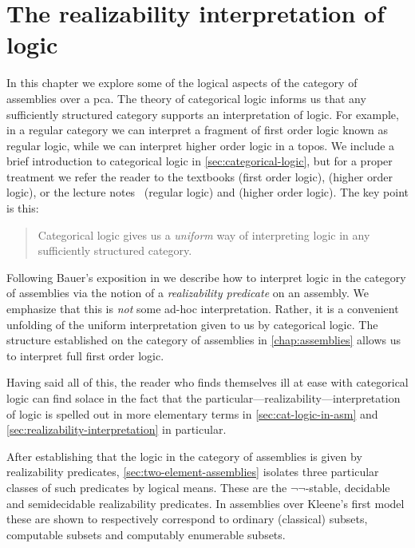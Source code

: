 \chapter{The realizability interpretation of logic}\label{chap:logic}

In this chapter we explore some of the logical aspects of the category of
assemblies over a pca.
%
%
The theory of categorical logic informs us that any sufficiently structured
category supports an interpretation of logic.
%
For example, in a regular category we can interpret a fragment of
first order logic known as regular logic, while we can interpret higher order
logic in a topos.
%
We include a brief introduction to categorical logic in
\cref{sec:categorical-logic}, but for a proper treatment we refer the reader to
the textbooks \cite{FreydScedrov1990} (first order logic),
\cite{LambekScott1986,MacLaneMoerdijk1994} (higher order logic), or the lecture
notes~\cite{vanOosten2016} (regular logic) and \cite{Streicher2004} (higher
order logic).
%
The key point is this:
\begin{quote}
  Categorical logic gives us a \emph{uniform} way of interpreting logic in any
  sufficiently structured category.
\end{quote}
%
Following Bauer's exposition in \cite{Bauer2023} we describe how to interpret
logic in the category of assemblies via the notion of a \emph{realizability
  predicate} on an assembly.
%
We emphasize that this is \emph{not} some ad-hoc interpretation. Rather, it is a
convenient unfolding of the uniform interpretation given to us by categorical
logic.
%
The structure established on the category of assemblies in
\cref{chap:assemblies} allows us to interpret full first order logic.

Having said all of this, the reader who finds themselves ill at ease with
categorical logic can find solace in the fact that the
particular---realizability---interpretation of logic is spelled out in more
elementary terms in \cref{sec:cat-logic-in-asm} and
\cref{sec:realizability-interpretation} in particular.

After establishing that the logic in the category of assemblies is given by
realizability predicates, \cref{sec:two-element-assemblies} isolates three
particular classes of such predicates by logical means. These are the
\(\lnot\lnot\)\nobreakdash-stable, decidable and semidecidable realizability
predicates.
%
In assemblies over Kleene's first model these are shown to respectively
correspond to ordinary (classical) subsets, computable subsets and computably
enumerable subsets.

